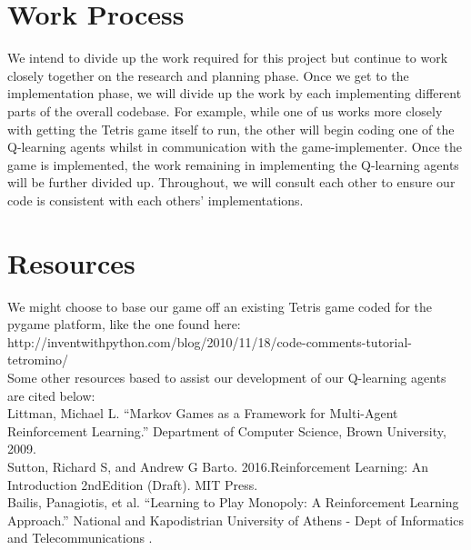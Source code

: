 \documentclass{article}
\begin{document}
\section{Work Process}
We intend to divide up the work required for this project but continue to work closely together on the research and planning phase. Once we get to the implementation phase, we will divide up the work by each implementing different parts of the overall codebase. For example, while one of us works more closely with getting the Tetris game itself to run, the other will begin coding one of the Q-learning agents whilst in communication with the game-implementer. Once the game is implemented, the work remaining in implementing the Q-learning agents will be further divided up. Throughout, we will consult each other to ensure our code is consistent with each others' implementations.

\section{Resources}
We might choose to base our game off an existing Tetris game coded for the pygame platform, like the one found here: http://inventwithpython.com/blog/2010/11/18/code-comments-tutorial-tetromino/ \\

Some other resources based to assist our development of our Q-learning agents are cited below:\\

Littman, Michael L. “Markov Games as a Framework for Multi-Agent Reinforcement Learning.” Department of Computer Science, Brown University, 2009.\\

Sutton, Richard S, and Andrew G Barto.  2016.Reinforcement Learning:  An Introduction 2ndEdition (Draft). MIT Press.\\

Bailis, Panagiotis, et al. “Learning to Play Monopoly: A Reinforcement Learning Approach.” National and Kapodistrian University of Athens - Dept of Informatics and Telecommunications .\\
\end{document}
